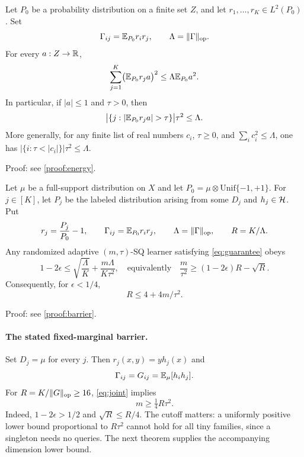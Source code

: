 \begin{lemma}\label{thm:energy}
Let $P_0$ be a probability distribution on a finite set $Z$, and let $r_1,\ldots,r_K\in L^2(P_0)$. Set
\[
 \Gamma_{ij}=\mathbb E_{P_0}r_i r_j,\qquad \Lambda=\|\Gamma\|_{\mathrm{op}}.
\]
For every $a:Z\to\mathbb R$,
\begin{equation}\label{eq:energy}
 \sum_{j=1}^K\bigl(\mathbb E_{P_0}r_j a\bigr)^2
 \leq\Lambda\mathbb E_{P_0}a^2.
\end{equation}
In particular, if $|a|\leq1$ and $\tau>0$, then
\begin{equation}\label{eq:count}
 \bigl|\{j:|\E_{P_0}r_j a|>\tau\}\bigr|\tau^2\leq\Lambda.
\end{equation}
More generally, for any finite list of real numbers $c_i$, $\tau\geq0$, and $\sum_i c_i^2\leq\Lambda$, one has $|\{i:\tau<|c_i|\}|\tau^2\leq\Lambda$.
\end{lemma}

\noindent Proof: see \cref{proof:energy}.\par



\begin{theorem}\label{thm:barrier}
Let $\mu$ be a full-support distribution on $X$ and let $P_0=\mu\otimes\mathrm{Unif}\{-1,+1\}$. For $j\in[K]$, let $P_j$ be the labeled distribution arising from some $D_j$ and $h_j\in\mathcal H$. Put
\[
 r_j=\frac{P_j}{P_0}-1,\qquad
 \Gamma_{ij}=\mathbb E_{P_0}r_i r_j,\qquad
 \Lambda=\|\Gamma\|_{\mathrm{op}},\qquad R=K/\Lambda.
\]
Any randomized adaptive $(m,\tau)$-SQ learner satisfying \eqref{eq:guarantee} obeys
\begin{equation}\label{eq:joint}
 1-2\epsilon\leq\sqrt{\frac\Lambda K}+
 \frac{m\Lambda}{K\tau^2},
 \quad\text{equivalently}\quad
 \frac m{\tau^2}\geq(1-2\epsilon)R-\sqrt R.
\end{equation}
Consequently, for $\epsilon<1/4$,
\begin{equation}\label{eq:Rbound}
 R\leq4+4m/\tau^2.
\end{equation}
\end{theorem}

\noindent Proof: see \cref{proof:barrier}.\par


\paragraph{The stated fixed-marginal barrier.}
Set $D_j=\mu$ for every $j$. Then $r_j(x,y)=y h_j(x)$ and
\[
 \Gamma_{ij}=G_{ij}=\mathbb E_\mu[h_i h_j].
\]
For $R=K/\|G\|_{\mathrm{op}}\geq16$, \eqref{eq:joint} implies
\begin{equation}\label{eq:fixed}
 m\geq\tfrac14 R\tau^2.
\end{equation}
Indeed, $1-2\epsilon>1/2$ and $\sqrt R\leq R/4$. The cutoff matters: a uniformly positive lower bound proportional to $R\tau^2$ cannot hold for all tiny families, since a singleton needs no queries. The next theorem supplies the accompanying dimension lower bound.

